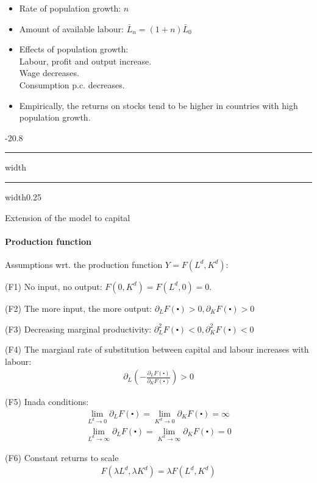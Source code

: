 \documentclass[a4paper,landscape,7pt,fleqn]{scrartcl}
\makeatletter
\renewcommand{\subsection}{\@startsection{subsection}{1}{0mm}%
{-2\baselineskip}{0.8\baselineskip}%
{\hrule depth 0.2pt width\columnwidth\hrule depth0.75pt
width0.25\columnwidth\vspace*{1.2em}\large\bfseries}}
\makeatother
\begin{document}
\begin{multicols*}{3}
\begin{itemize}
\item Rate of population growth: $n$
\item Amount of available labour: $\bar L_n = (1+n) \bar L_0$
\item Effects of population growth: \\
Labour, profit and output increase. \\
Wage decreases. \\
Consumption p.c. decreases.
\item Empirically, the returns on stocks tend to be higher in countries with high population growth.
\end{itemize}

\subsection{Extension of the model to capital}

\paragraph{Production function}

Assumptions wrt. the production function $Y = F(L^d,K^d)$:
\begin{description}
\item{(F1)} No input, no output: $F(0,K^d) = F(L^d,0) = 0$.
\item{(F2)} The more input, the more output: $\partial_L F(\centerdot) > 0, \partial_K F(\centerdot) > 0$
\item{(F3)} Decreasing marginal productivity: $\partial_L^2 F(\centerdot) < 0, \partial_K^2 F(\centerdot) < 0$
\item{(F4)} The margianl rate of substitution between capital and labour increases with labour:
\begin{align*}
\partial_L \left( -\frac{\partial_L F(\centerdot)}{\partial_K F(\centerdot)} \right) > 0
\end{align*}
\item{(F5)} Inada conditions:
\begin{align*}
\lim\limits_{L^d \to 0} \partial_L F(\centerdot)= \lim\limits_{K^d \to 0} \partial_K F(\centerdot) = \infty \\
\lim\limits_{L^d \to \infty} \partial_L F(\centerdot)= \lim\limits_{K^d \to \infty} \partial_K F(\centerdot) = 0
\end{align*}
\item{(F6)} Constant returns to scale
\begin{align*}
F(\lambda L^d,\lambda K^d) = \lambda F(L^d,K^d)
\end{align*}
\end{description}


\end{multicols*}
\end{document}

